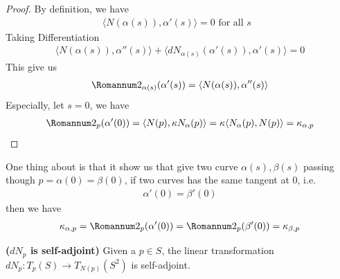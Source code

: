 \documentclass{report}
\begin{document}
\begin{proof}
By definition, we have 
\begin{align*}
\langle N(\alpha (s)),\alpha '(s)\rangle =0\text{ for all $s$ }
\end{align*}
Taking Differentiation
\begin{align*}
\langle N(\alpha (s)),\alpha ''(s)\rangle + \langle dN_{\alpha (s)}(\alpha '(s)), \alpha '(s)\rangle =0 
\end{align*}
This give us 
\begin{align*}
\Sec_{\alpha (s)}(\alpha '(s))= \langle N(\alpha (s)),\alpha ''(s)\rangle 
\end{align*}
Especially, let $s=0$, we have 
\begin{align*}
\Sec_p(\alpha '(0))=\langle N(p),\kappa N_\alpha (p)\rangle = \kappa \langle N_\alpha (p),N(p)\rangle = \kappa_{\alpha,p }
\end{align*}
\end{proof}
\begin{mdframed}
One thing about  is that it show us that give two curve $\alpha (s),\beta (s)$ passing though $p=\alpha (0)=\beta (0)$, if two curves has the same tangent at $0$, i.e. 
 \begin{align*}
\alpha '(0)=\beta '(0)
\end{align*}
then we have 
\begin{align*}
\kappa_{\alpha ,p}=\Sec_p (\alpha '(0))=\Sec_p (\beta '(0))=\kappa_{\beta ,p}
\end{align*}
\end{mdframed}
\begin{theorem}
\textbf{($dN_p$ is self-adjoint)} Given a $p\in  S$, the linear transformation $dN_p:T_p(S)\rightarrow T_{N(p)}(S^2)$ is self-adjoint.
\end{theorem}
\end{document}
